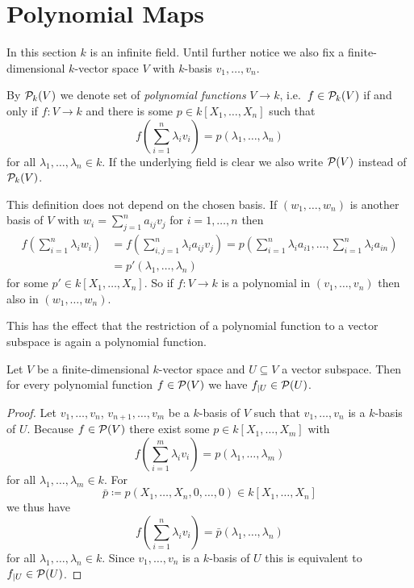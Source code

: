 




\section{Polynomial Maps}


In this section $k$ is an infinite field.
Until further notice we also fix a finite-dimensional $k$-vector space $V$ with $k$-basis $v_1, \dotsc, v_n$.


\begin{defi}
  By $\mathcal{P}_k(V)$ we denote set of \emph{polynomial functions} $V \to k$, i.e.\ $f \in \mathcal{P}_k(V)$ if and only if $f \colon V \to k$ and there is some $p \in k[X_1, \dotsc, X_n]$ such that
  \[
      f\left( \sum_{i=1}^n \lambda_i v_i \right)
    = p(\lambda_1, \dotsc, \lambda_n)
  \]
  for all $\lambda_1, \dotsc, \lambda_n \in k$.
  If the underlying field is clear we also write $\mathcal{P}(V)$ instead of $\mathcal{P}_k(V)$.
\end{defi}


This definition does not depend on the chosen basis.
If $(w_1, \dotsc, w_n)$ is another basis of $V$ with $w_i = \sum_{j=1}^n a_{ij} v_j$ for $i = 1, \dotsc, n$ then
\begin{align*}
      f\left( \sum_{i=1}^n \lambda_i w_i \right)
  &=  f\left( \sum_{i,j=1}^n \lambda_i a_{ij} v_j \right)
   =  p\left( \sum_{i=1}^n \lambda_i a_{i1}, \dotsc, \sum_{i=1}^n \lambda_{i} a_{in} \right)  \\
  &=  p'(\lambda_1, \dotsc, \lambda_n)
\end{align*}
for some $p' \in k[X_1, \dotsc, X_n]$.
So if $f \colon V \to k$ is a polynomial in $(v_1, \dotsc, v_n)$ then also in $(w_1, \dotsc, w_n)$.

This has the effect that the restriction of a polynomial function to a vector subspace is again a polynomial function.

\begin{lem}
  Let $V$ be a finite-dimensional $k$-vector space and $U \subseteq V$ a vector subspace.
  Then for every polynomial function $f \in \mathcal{P}(V)$ we have $f_{|U} \in \mathcal{P}(U)$.
\end{lem}
\begin{proof}
  Let $v_1, \dotsc, v_n$, $v_{n+1}, \dotsc, v_m$ be a $k$-basis of $V$ such that $v_1, \dotsc, v_n$ is a $k$-basis of $U$.
  Because $f \in \mathcal{P}(V)$ there exist some $p \in k[X_1, \dotsc, X_m]$ with
  \[
      f\left( \sum_{i=1}^m \lambda_i v_i \right)
    = p(\lambda_1, \dotsc, \lambda_m)
  \]
  for all $\lambda_1, \dotsc, \lambda_m \in k$. For
  \[
              \bar{p}
    \coloneqq p(X_1, \dotsc, X_n, 0, \dotsc, 0)
    \in       k[X_1, \dotsc, X_n]
  \]
  we thus have
  \[
      f\left( \sum_{i=1}^n \lambda_i v_i \right)
    = \bar{p}(\lambda_1, \dotsc, \lambda_n)
  \]
  for all $\lambda_1, \dotsc, \lambda_n \in k$.
  Since $v_1, \dotsc, v_n$ is a $k$-basis of $U$ this is equivalent to $f_{|U} \in \mathcal{P}(U)$.
\end{proof}


